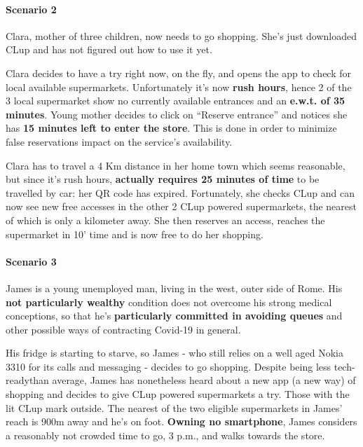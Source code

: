 \paragraph{Scenario 2}

Clara, mother of three children, now needs to go shopping. She's just downloaded CLup and has not figured out how to use it yet.

Clara decides to have a try right now, on the fly, and opens the app to check for local available supermarkets. 
\newline Unfortunately it's now \textbf{rush hours}, hence 2 of the 3 local supermarket show no currently available entrances and an \textbf{e.w.t. of 35 minutes}. Young mother decides to click on ``Reserve entrance'' and notices she has \textbf{15 minutes left to enter the store}. This is done in order to minimize false reservations impact on the service's availability.

Clara has to travel a 4 Km distance in her home town which seems reasonable, but since it's rush hours, \textbf{actually requires 25 minutes of time} to be travelled by car: her QR code has expired.\newline
Fortunately, she checks CLup and can now see new free accesses in the other 2 CLup powered supermarkets, the nearest of which is only a kilometer away. She then reserves an access, reaches the supermarket in 10' time and is now free to do her shopping.

\paragraph{Scenario 3}
James is a young unemployed man, living in the west, outer side of Rome. His \textbf{not particularly wealthy} condition does not overcome his strong medical conceptions, so that he's \textbf{particularly committed in avoiding queues} and other possible ways of contracting Covid-19 in general.

His fridge is starting to starve, so James - who still relies on a well aged Nokia 3310 for its calls and messaging - decides to go shopping. Despite being \guillemotleft less tech-ready\guillemotright \space than average, James has nonetheless heard about a new app (a new way) of shopping and decides to give CLup powered supermarkets a try. Those with the lit CLup mark outside.
\newline The nearest of the two eligible supermarkets in James' reach is 900m away and he's on foot. \textbf{Owning no smartphone}, James considers a reasonably not crowded time to go, 3 p.m., and walks towards the store. 

